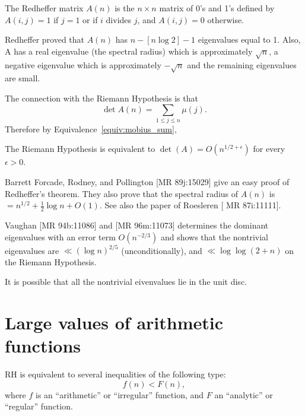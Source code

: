 \documentclass[12pt,letterpaper, reqno]{aimpl}
\begin{document}
\begin{problemblock}
The Redheffer matrix $A(n)$ is the $n\times n$  matrix of 0's and 1's
defined by $A(i,j) = 1$ if $j = 1$ or if $i$ divides $j$, and
$A(i,j) = 0$ otherwise.

Redheffer proved that $A(n)$ has $ n-[n \log 2]-1$ eigenvalues equal to 1.
Also,     A has a real eigenvalue  (the spectral radius) which is approximately $\sqrt{n}$,
     a negative eigenvalue which is approximately $-\sqrt{n}$ and
     the remaining eigenvalues are small.

The connection with the Riemann Hypothesis is that
$$
\det A(n) = \sum_{1\le j\le n} \mu(j) .
$$
Therefore by Equivalence~\ref{equiv:mobius_sum},

\begin{rhequivalence}[2.3] The Riemann Hypothesis is equivalent to
$\det(A) = O(n^{1/2+\epsilon})$ for every $\epsilon > 0$.
\end{rhequivalence}

\begin{remark}

Barrett  Forcade, Rodney, and Pollington
[MR 89j:15029]  give an easy proof of Redheffer's theorem.
They also prove that the spectral radius of $A(n)$ is
$=n^{1/2}+\tfrac 12\log n+O(1).$  See also the paper of
Roesleren [ MR 87i:11111].
\end{remark}


\begin{remark}

Vaughan [MR 94b:11086] and [MR 96m:11073]
determines the dominant eigenvalues with an error term $O(n^{-2/3})$ and shows that the nontrivial eigenvalues are  $\ll(\log n)^{2/5}$ (unconditionally), and $\ll\log\log(2+n)$ on the Riemann Hypothesis.
\end{remark}

\begin{remark}
It is possible that all the nontrivial eivenvalues lie in the unit disc.
\end{remark}
\end{problemblock}


\section{Large values of arithmetic functions}

RH is equivalent to several inequalities of the following type:
$$
f(n) < F(n),
$$
where $f$ is an ``arithmetic'' or ``irregular'' function,
and $F$ an ``analytic'' or ``regular'' function.
\end{document}
